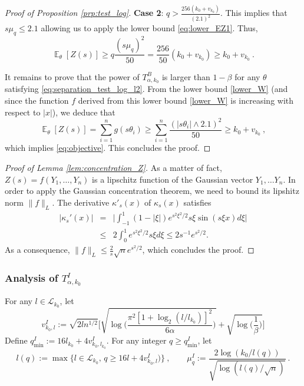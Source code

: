 \documentclass[twoside,11pt]{article}
\def\beq{\begin{equation}}
\def\eeq{\end{equation}}
\def\beqn{\begin{eqnarray*}}
\def\eeqn{\end{eqnarray*}}
\def\cL{\mathcal{L}}
\newcommand{\E}{\operatorname{\mathbb{E}}}
\newcommand{\<}{\langle}
\renewcommand{\>}{\rangle}
\begin{document}
\begin{proof}[Proof of Proposition \ref{prp:test_log}]
\noindent 
{\bf Case 2}: $q> \frac{256(k_0+v_{k_0})}{(2.1)^2}$. This implies that $s\mu_q\leq 2.1$ allowing us to apply the lower bound \eqref{eq:lower_EZ1}. Thus, 
\[
\E_{\theta}[Z(s)] \geq q\frac{(s\mu_{q})^2}{50}= \frac{256}{50} (k_0+ v_{k_0})\geq k_0+v_{k_0}\ .
\]


\bigskip 

It remains to prove that the power of $T^{B}_{\alpha,k_0}$  is larger than $1-\beta$ for any $\theta$ satisfying \eqref{eq:separation_test_log_l2}. From the lower bound \eqref{lower_W} (and since the function $f$ derived from this lower bound \eqref{lower_W} is increasing with respect to $|x|$), we deduce that
\[
 \E_{\theta}[Z(s)]= \sum_{i=1}^n g(s\theta_i)\geq \sum_{i=1}^n \frac{(|s\theta_i|\wedge 2.1)^2}{50}\geq  k_0+v_{k_0}\ ,
\]
which implies  \eqref{eq:objective}. This  concludes the proof.





 \end{proof}


\begin{proof}[Proof of Lemma \ref{lem:concentration_Z}]
As a matter of fact, $Z(s)=f(Y_1,\ldots, Y_n)$ is a lipschitz function of the Gaussian vector $Y_1,\ldots Y_n$. In order to apply the Gaussian concentration theorem, we need to bound its lipshitz norm $\|f\|_L$. The derivative $\kappa'_s(x)$ of $\kappa_s(x)$ satisfies
\beqn 
\big|\kappa_s'(x)\Big|&=& \Big|\int_{-1}^1 (1-|\xi|) e^{s^2\xi^2/2} s\xi \sin(s\xi x)d\xi \Big|\\
&\leq& 2 \int_{0}^{1} e^{s^2\xi^2/2} s\xi d\xi \leq 2s^{-1}e^{s^2/2}.
\eeqn 
As a consequence,  $\|f\|_L\leq \frac{2}{s}\sqrt{n}e^{s^2/2}$, which concludes the proof.
 \end{proof}
 







 


 
\subsubsection{Analysis of $T_{\alpha,k_0}^I$}
 

   For any $l\in \cL_{k_0}$, let
\beq\label{eq:defi_omega}
v^I_{k_0,l}:= \sqrt{2ln^{1/2}}\Big[\sqrt{\log\Big(\frac{\pi^2 [1+\log_2(l/l_{k_0})]^2}{6\alpha}\Big)}+ \sqrt{\log\Big(\frac{1}{\beta}\Big)}\Big]
\eeq
Define $q^I_{\min}:= 16l_{k_0} + 4 v^I_{k_0,l_{k_0}}$. For any integer $q\geq q^{I}_{\min}$, let
\beq \label{eq:definition_l(q)_mu^I}
l(q):= \max\big\{l\in \cL_{k_0}, \, q\geq 16l + 4v^I_{k_0,l})\big\}\ ,\quad \quad \mu^I_{q} := \frac{2\log(k_0/l(q))}{\sqrt{\log(l(q)/\sqrt{n})}}\ .
\eeq
\end{document}
